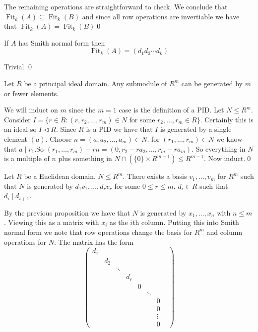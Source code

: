 \documentclass{article}
\newcommand{\nrm}{\triangleleft}
\DeclareMathOperator{\Fit}{Fit}
\begin{document}
\begin{itemize}
The remaining operations are straightforward to check. We conclude that $ \Fit_k(A)\subseteq \Fit_k(B) $ and since all row operations are invertiable we have that $ \Fit_k(A)=\Fit_k(B) $\qed
\begin{corollary}
  If $ A $ has Smith normal form then
  \[
    \Fit_k(A)=(d_1d_2\cdots d_k)
  \]
\end{corollary}
\pf Trivial \qed
\begin{proposition}
  Let $ R $ be a principal ideal domain. Any submodule of $ R^m $ can be generated by $ m $ or fewer elements.
\end{proposition}
\pf We will induct on $ m $ since the $ m=1 $ case is the definition of a PID. Let $ N\le R^m $. Consider $ I=\{r\in R:(r,r_2,\dots, r_m)\in N \text{ for some } r_2,\dots, r_m\in R\}$. Certainly this is an ideal so $ I\nrm R $. Since $ R $ is a PID we have that $ I $ is generated by a single element $ (a) $. Choose $ n=(a,a_2,\dots, a_m)\in N $. for $ (r_1,\dots, r_m)\in N $ we know that $ a\mid r_1 $.So $ (r_1,\dots, r_m)-rn=(0,r_2-ra_2,\dots, r_m-ra_m) $. So everything in $ N $ is a multiple of $ n $ plus something in $ N\cap (\{0\}\times R^{m-1})\le R^{m-1}  $. Now induct.\qed
\begin{theorem}
	Let $ R $ be a Euclidean domain. $ N\le R^m $. There exists a basis $ v_1,\dots, v_m $ for $ R^m $ such that $ N $ is generated by $ d_1v_1,\dots, d_rv_r $ for some $ 0\le r\le m $, $ d_i\in R $ such that $ d_i\mid d_{i+1} $.
\end{theorem}
\pf By the previous proposition we have that $ N $ is generated by $ x_1,\dots, x_n $ with $ n\le m $. Viewing this as a matrix with $ x_i $ as the $ i $th column. Putting this into Smith normal form we note that row operations change the basis for $ R^m $ and column operations for $ N $. The matrix has the form
\[
  \begin{pmatrix}
	  d_1 & & & & & & & \\
	      & d_2 & & & & & \\
	      & & \ddots & & & & \\
	      & & & d_r & & & \\
	      & & & & 0 & & \\
	      & & & & & \ddots & \\
	      & & & & & & 0 \\
	      & & & & & & 0 \\
	      & & & & & & \vdots \\
	      & & & & & & 0
  \end{pmatrix}
\]
\end{itemize}
\end{document}
